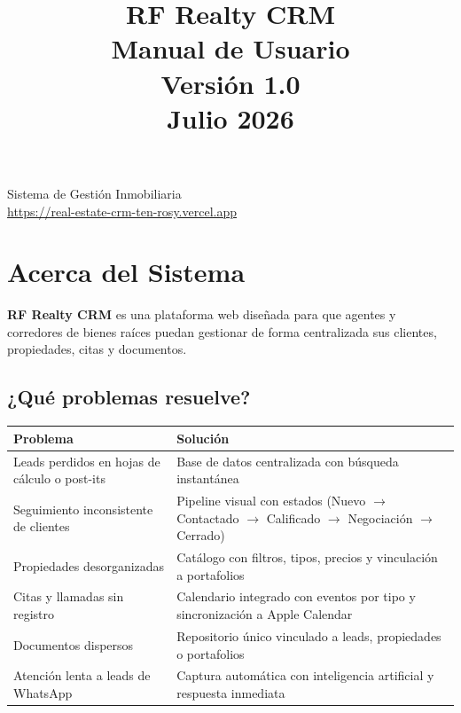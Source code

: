 \documentclass[12pt,oneside]{article}
\title{
  \vspace*{3cm}
  {\Huge\bfseries\color{primary} RF Realty CRM}\\[0.5cm]
  {\Large Manual de Usuario}\\[1.5cm]
  {\large Versión 1.0}\\
  {\large Julio 2026}
}
\author{}
\date{}
\begin{document}
\maketitle
\thispagestyle{empty}
\vfill
\begin{center}
  \textcolor{secondary}{\small Sistema de Gestión Inmobiliaria}\\[4pt]
  \textcolor{secondary}{\small \url{https://real-estate-crm-ten-rosy.vercel.app}}
\end{center}
\newpage

\tableofcontents
\newpage

\section{Acerca del Sistema}

\textbf{RF Realty CRM} es una plataforma web diseñada para que agentes y corredores de bienes raíces puedan gestionar de forma centralizada sus clientes, propiedades, citas y documentos.

\subsection{¿Qué problemas resuelve?}

\begin{tabularx}{\textwidth}{|X|X|}
\hline
\rowcolor{primary!10}
\textbf{Problema} & \textbf{Solución} \\
\hline
Leads perdidos en hojas de cálculo o post-its & Base de datos centralizada con búsqueda instantánea \\
\hline
Seguimiento inconsistente de clientes & Pipeline visual con estados (Nuevo $\rightarrow$ Contactado $\rightarrow$ Calificado $\rightarrow$ Negociación $\rightarrow$ Cerrado) \\
\hline
Propiedades desorganizadas & Catálogo con filtros, tipos, precios y vinculación a portafolios \\
\hline
Citas y llamadas sin registro & Calendario integrado con eventos por tipo y sincronización a Apple Calendar \\
\hline
Documentos dispersos & Repositorio único vinculado a leads, propiedades o portafolios \\
\hline
Atención lenta a leads de WhatsApp & Captura automática con inteligencia artificial y respuesta inmediata \\
\hline
\end{tabularx}
\end{document}

